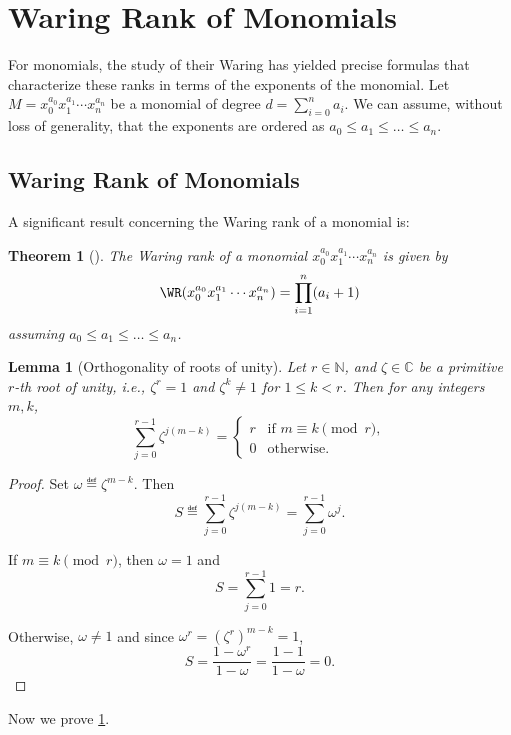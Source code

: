 \documentclass[a4paper,11pt,american]{article}
\newtheorem{theorem}{Theorem}[section]
\newtheorem{lemma}{Lemma}[section]
\theoremstyle{definition}
\theoremstyle{remark}
\begin{document}
\section{Waring Rank of Monomials}

For monomials, the study of their Waring  has yielded precise formulas that characterize these ranks in terms of the exponents of the monomial.
Let $M = x_0^{a_0} x_1^{a_1} \cdots x_n^{a_n}$ be a monomial of degree $d = \sum_{i=0}^{n} a_i$. We can assume, without loss of generality, that the exponents are ordered as $a_0 \leq a_1 \leq \dots \leq a_n$.

\subsection{Waring Rank of Monomials}
A significant result concerning the Waring rank of a monomial is:
\begin{theorem}[\cite{CarliniCatalisanoGeramita2012,BuczynskaBuczynskiTeitler2014}]\label{thm:tight-bound-upper-bound-monomial-wr}
The Waring rank of a monomial $x_0^{a_0} x_1^{a_1} \cdots x_n^{a_n}$  is given by
\[
\WR(x_0^{a_0} x_1^{a_1} \cdots x_n^{a_n}) = \prod_{i=1}^{n} (a_i + 1)
\]
assuming $a_0 \leq a_1 \leq \dots \leq a_n$.
\end{theorem}

\begin{lemma}[Orthogonality of roots of unity]\label{lem:orthogonality}
Let \( r \in \mathbb{N} \), and \(\zeta \in \mathbb{C}\) be a primitive \(r\)-th root of unity, i.e., \(\zeta^r = 1\) and \(\zeta^k \neq 1\) for \(1 \le k < r\). Then for any integers \(m, k\),
\[
 \sum_{j=0}^{r-1} \zeta^{j(m-k)} = 
\begin{cases}
r & \text{if } m \equiv k \pmod{r}, \\
0 & \text{otherwise}.
\end{cases}
\]
\end{lemma}

\begin{proof}
Set \(\omega \eqdef \zeta^{m-k}\). Then
\[
S \eqdef\sum_{j=0}^{r-1} \zeta^{j(m-k)} = \sum_{j=0}^{r-1} \omega^j.
\]

If \(m \equiv k \pmod{r}\), then \(\omega = 1\) and
\[
S = \sum_{j=0}^{r-1} 1 = r.
\]

Otherwise, \(\omega \neq 1\) and since \(\omega^r = (\zeta^r)^{m-k} = 1\), 
\[
S = \frac{1 - \omega^r}{1 - \omega} = \frac{1 - 1}{1 - \omega} = 0.
\]

\end{proof}

Now we prove \cref{thm:tight-bound-upper-bound-monomial-wr}.

\printbibliography
    
\end{document}
